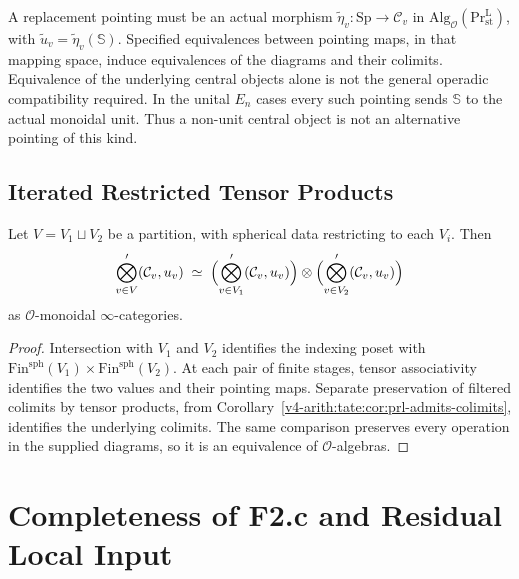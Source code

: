 \begin{remark}
\label{v4-arith:tate:rem:non-spherical-insertion}
A replacement pointing must be an actual morphism
\(\widetilde\eta_v:\mathrm{Sp}\to\mathcal C_v\) in
\(\mathrm{Alg}_{\mathcal O}(\mathrm{Pr}^{\mathrm L}_{\mathrm{st}})\),
with \(\widetilde u_v=\widetilde\eta_v(\mathbb S)\).
Specified equivalences between pointing maps, in that mapping
space, induce equivalences of the diagrams and their colimits.
Equivalence of the underlying central objects alone is not the
general operadic compatibility required. In the unital \(E_n\)
cases every such pointing sends \(\mathbb S\) to the actual
monoidal unit. Thus a non-unit central object is not an alternative
pointing of this kind.
\end{remark}

\subsection{Iterated Restricted Tensor Products}

\begin{proposition}
\label{v4-arith:tate:prop:iterated-restricted}
\ClaimStatusProvedHere Let \(V=V_{1}\sqcup V_{2}\) be a partition,
with spherical data restricting to each \(V_{i}\). Then
\[
\bigotimes_{v\in V}^{\prime}(\mathcal{C}_{v},u_{v})\;\simeq\;\Bigl(\bigotimes_{v\in V_{1}}^{\prime}(\mathcal{C}_{v},u_{v})\Bigr)\otimes\Bigl(\bigotimes_{v\in V_{2}}^{\prime}(\mathcal{C}_{v},u_{v})\Bigr)
\]
as \(\mathcal{O}\)-monoidal \(\infty\)-categories.
\end{proposition}

\begin{proof}
Intersection with \(V_1\) and \(V_2\) identifies the indexing
poset with
\(\mathrm{Fin}^{\mathrm{sph}}(V_1)\times
\mathrm{Fin}^{\mathrm{sph}}(V_2)\).
At each pair of finite stages, tensor associativity identifies
the two values and their pointing maps. Separate preservation
of filtered colimits by tensor products, from
Corollary~\ref{v4-arith:tate:cor:prl-admits-colimits}, identifies
the underlying colimits. The same comparison preserves every
operation in the supplied diagrams, so it is an equivalence
of \(\mathcal O\)-algebras.
\end{proof}

\section{Completeness of F2.c and Residual Local Input}
\label{v4-arith:tate:completeness-F2}

